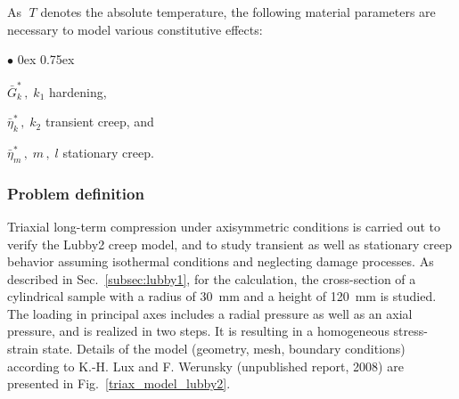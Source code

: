 As $\;T$ denotes the absolute temperature, the following material
parameters are necessary to model various constitutive effects:
\begin{list}{$\bullet$}{  
   \parsep0ex \itemsep0.75ex}
\item ${\bar G}^{\ast}_k\,,\;k_1$ \hspace*{3.0ex} hardening,
\item ${\bar\eta}^{\ast}_k\,,\;k_2$ \hspace*{4.0ex} transient creep, and
\item ${\bar\eta}^{\ast}_m\,,\;m\,,\;l$ \hspace*{1.0ex} stationary creep.
\end{list}

\clearpage

\subsubsection*{Problem definition}

Triaxial long-term compression under axisymmetric conditions is carried out to verify the Lubby2 creep model, and to study transient as well as stationary creep behavior assuming isothermal conditions and neglecting damage processes. As described in Sec.~\ref{subsec:lubby1}, for the calculation, the cross-section of a cylindrical sample with a radius of 30~mm and a height of 120~mm is studied. The loading in principal axes includes a radial pressure as well as an axial pressure, and is realized in two steps. It is resulting in a homogeneous stress-strain state. Details of the model (geometry, mesh, boundary conditions) according to K.-H. Lux and F. Werunsky (unpublished report, 2008) are presented in Fig.~\ref{triax_model_lubby2}.

